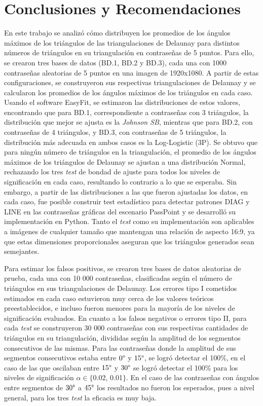 \documentclass[12pt]{report}
\begin{document}
\chapter*{Conclusiones y Recomendaciones }
En este trabajo se analizó cómo distribuyen los promedios de los ángulos máximos de los triángulos de las triangulaciones de Delaunay para distintos números de triángulos en su triangulación en contraseñas de 5 puntos. Para ello, se crearon tres bases de datos (BD.1, BD.2 y BD.3), cada una con 1000 contraseñas aleatorias de 5 puntos en una imagen de 1920x1080. A partir de estas configuraciones, se construyeron sus respectivas triangulaciones de Delaunay y se calcularon los promedios de los ángulos máximos de los triángulos en cada caso. Usando el software EasyFit, se estimaron las distribuciones de estos valores, encontrando que para BD.1, correspondiente a contraseñas con 3 triángulos, la distribución que mejor se ajusta es la \textit{Johnson SB}, mientras que para BD.2, con contraseñas de 4 triángulos, y BD.3, con contraseñas de 5 triángulos, la distribución más adecuada en ambos casos es la Log-Logistic (3P). Se obtuvo que para ningún número de  triángulos en la triangulación, el promedio de los ángulos máximos de los triángulos de Delaunay  se ajustan a una distribución Normal, rechazando los tres \textit{test} de bondad de ajuste para todos los niveles de significación en cada caso, resultando lo contrario a lo que se esperaba. Sin embargo, a partir de las distribuciones a las que fueron ajustadas los datos, en cada caso, fue posible construir test estadístico para detectar patrones DIAG y LINE en las contraseñas gráficas del escenario PassPoint y se desarrolló su implementación en Python. Tanto el \textit{test} como su implementación son aplicables a imágenes de cualquier tamaño que mantengan una relación de aspecto 16:9, ya que estas dimensiones proporcionales aseguran que los triángulos generados sean semejantes. 

Para estimar los falsos positivos, se crearon tres bases de datos aleatorias de prueba, cada una con 10 000 contraseñas, clasificadas según el número de triángulos en sus triangulaciones de Delaunay. Los errores tipo I cometidos estimados en cada caso estuvieron muy cerca de los valores teóricos preestablecidos, e incluso fueron menores para la mayoría de los niveles de significación evaluados. En cuanto a los falsos negativos o errores tipo II, para cada \textit{test} se construyeron 30 000 contraseñas con sus respectivas cantidades de triángulos en  su triangulación, divididas según la amplitud de los segmentos consecutivos de las mismas. Para las contraseñas donde  la amplitud de sus segmentos consecutivos estaba entre $0\degree$ y $15\degree$, se logró detectar el 100\%, en el caso de las que oscilaban entre $15\degree$ y $30\degree$  se logró detectar el 100\% para los niveles de significación $\alpha \in \{$0.02, 0.01$\}$. En el caso de las contraseñas con ángulos entre segmentos de $30\degree$ a $45\degree$  los resultados no fueron los esperados, pues a nivel general, para los tres \textit{test}   la eficacia es muy baja.
\end{document}
